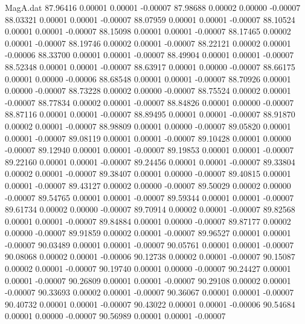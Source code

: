 \begin{filecontents}{MagA.dat}
  87.96416    0.00001    0.00001   -0.00007
  87.98688    0.00002    0.00000   -0.00007
  88.03321    0.00001    0.00001   -0.00007
  88.07959    0.00001    0.00001   -0.00007
  88.10524    0.00001    0.00001   -0.00007
  88.15098    0.00001    0.00001   -0.00007
  88.17465    0.00002    0.00001   -0.00007
  88.19746    0.00002    0.00001   -0.00007
  88.22121    0.00002    0.00001   -0.00006
  88.33700    0.00001    0.00001   -0.00007
  88.49904    0.00001    0.00001   -0.00007
  88.52348    0.00001    0.00001   -0.00007
  88.63917    0.00001    0.00000   -0.00007
  88.66175    0.00001    0.00000   -0.00006
  88.68548    0.00001    0.00001   -0.00007
  88.70926    0.00001    0.00000   -0.00007
  88.73228    0.00002    0.00000   -0.00007
  88.75524    0.00002    0.00001   -0.00007
  88.77834    0.00002    0.00001   -0.00007
  88.84826    0.00001    0.00000   -0.00007
  88.87116    0.00001    0.00001   -0.00007
  88.89495    0.00001    0.00001   -0.00007
  88.91870    0.00002    0.00001   -0.00007
  88.98809    0.00001    0.00000   -0.00007
  89.05820    0.00001    0.00001   -0.00007
  89.08119    0.00001    0.00001   -0.00007
  89.10428    0.00001    0.00000   -0.00007
  89.12940    0.00001    0.00001   -0.00007
  89.19853    0.00001    0.00001   -0.00007
  89.22160    0.00001    0.00001   -0.00007
  89.24456    0.00001    0.00001   -0.00007
  89.33804    0.00002    0.00001   -0.00007
  89.38407    0.00001    0.00000   -0.00007
  89.40815    0.00001    0.00001   -0.00007
  89.43127    0.00002    0.00000   -0.00007
  89.50029    0.00002    0.00000   -0.00007
  89.54765    0.00001    0.00001   -0.00007
  89.59344    0.00001    0.00001   -0.00007
  89.61734    0.00002    0.00000   -0.00007
  89.70914    0.00002    0.00001   -0.00007
  89.82568    0.00001    0.00001   -0.00007
  89.84884    0.00001    0.00000   -0.00007
  89.87177    0.00002    0.00000   -0.00007
  89.91859    0.00002    0.00001   -0.00007
  89.96527    0.00001    0.00001   -0.00007
  90.03489    0.00001    0.00001   -0.00007
  90.05761    0.00001    0.00001   -0.00007
  90.08068    0.00002    0.00001   -0.00006
  90.12738    0.00002    0.00001   -0.00007
  90.15087    0.00002    0.00001   -0.00007
  90.19740    0.00001    0.00000   -0.00007
  90.24427    0.00001    0.00001   -0.00007
  90.26809    0.00001    0.00001   -0.00007
  90.29108    0.00002    0.00001   -0.00007
  90.33693    0.00002    0.00001   -0.00007
  90.36067    0.00001    0.00001   -0.00007
  90.40732    0.00001    0.00001   -0.00007
  90.43022    0.00001    0.00001   -0.00006
  90.54684    0.00001    0.00000   -0.00007
  90.56989    0.00001    0.00001   -0.00007

\end{filecontents}
